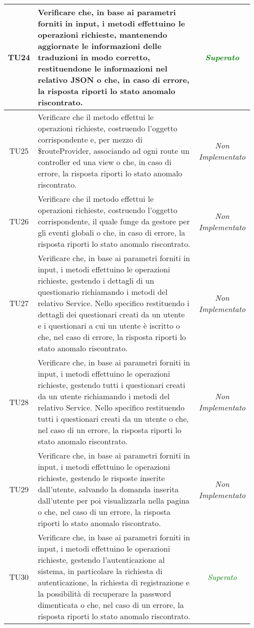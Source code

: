 \begin{longtable}{|c|>{}m{10cm}|c|}
\hypertarget{TU24}{TU24} & Verificare che, in base ai parametri forniti in input, i metodi effettuino le operazioni richieste, mantenendo aggiornate le informazioni delle traduzioni in modo corretto, restituendone le informazioni nel relativo JSON o che, in caso di errore, la risposta riporti lo stato anomalo riscontrato. & \textcolor{Green}{\textit{Superato}}\\ \hline
\hypertarget{TU25}{TU25} & Verificare che il metodo effettui le operazioni richieste, costruendo l’oggetto corrispondente e, per mezzo
di \$routeProvider, associando ad ogni route un controller ed una view o che, in caso di errore, la
risposta riporti lo stato anomalo riscontrato. & \textit{Non Implementato}\\ \hline
\hypertarget{TU26}{TU26} & Verificare che il metodo effettui le operazioni richieste, costruendo l’oggetto corrispondente, il quale funge da gestore per gli eventi globali o che, in caso di
errore, la risposta riporti lo stato anomalo riscontrato. & \textit{Non Implementato}\\ \hline
\hypertarget{TU27}{TU27} & Verificare che, in base ai parametri forniti in input, i metodi effettuino le operazioni richieste, gestendo i dettagli di un questionario richiamando i metodi del relativo Service. Nello specifico restituendo i dettagli dei questionari creati da un utente e i questionari a cui un utente è iscritto o che, nel caso di errore, la risposta riporti lo stato anomalo riscontrato. & \textit{Non Implementato}\\ \hline
\hypertarget{TU28}{TU28} & Verificare che, in base ai parametri forniti in input, i metodi effettuino le operazioni richieste, gestendo tutti i questionari creati da un utente richiamando i metodi del relativo Service. Nello specifico restituendo tutti i questionari creati da un utente o che, nel caso di un errore, la risposta riporti lo stato anomalo riscontrato.  & \textit{Non Implementato}\\ \hline
\hypertarget{TU29}{TU29} & Verificare che, in base ai parametri forniti in input, i metodi effettuino le operazioni richieste, gestendo le risposte inserite dall'utente, salvando la domanda inserita dall'utente per poi visualizzarla nella pagina o che, nel caso di un errore, la risposta riporti lo stato anomalo riscontrato. & \textit{Non Implementato}\\ \hline
\hypertarget{TU30}{TU30} & Verificare che, in base ai parametri forniti in input, i metodi effettuino le operazioni richieste, gestendo l'autenticazione al sistema, in particolare la richiesta di autenticazione, la richiesta di registrazione e la possibilità di recuperare la password dimenticata o che, nel caso di un errore, la risposta riporti lo stato anomalo riscontrato. & \textcolor{Green}{\textit{Superato}}\\ \hline

\end{longtable}
